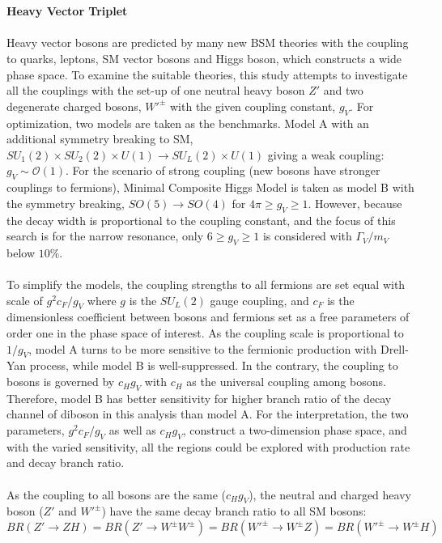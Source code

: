 \\
\\{\bf Heavy Vector Triplet}
\\
\\Heavy vector bosons are predicted by many new BSM theories with the coupling to quarks, leptons, SM vector bosons and Higgs boson, which constructs a wide phase space. To examine the suitable theories, this study attempts to investigate all the couplings with the set-up of one neutral heavy boson $Z'$ and two degenerate charged bosons, $W'^{\pm}$ with the given coupling constant, $g_{V}$. For optimization,  two models are taken as the benchmarks. Model A with an additional symmetry breaking to SM, $SU_{1}(2)\times SU_{2}(2) \times U(1) \rightarrow SU_{L}(2) \times U(1)$ giving a weak coupling: $g_{V} \sim \mathcal{O}(1)$. For the scenario of strong coupling (new bosons have stronger couplings to fermions), Minimal Composite Higgs Model is taken as model B with the symmetry breaking, $SO(5) \rightarrow SO(4)$ for $4\pi \geq g_{V} \geq 1$. However, because the decay width is proportional to the coupling constant, and the focus of this search is for the narrow resonance, only $6 \geq g_{V} \geq 1$ is considered with $\Gamma_{V}/m_{V}$ below $10\%$.
\\
\\To simplify the models, the coupling strengths to all fermions are set equal with scale of $g^2c_{F}/g_{V}$ where $g$ is the $SU_{L}(2)$ gauge coupling, and $c_{F}$ is the dimensionless coefficient between bosons and fermions set as a free parameters of order one in the phase space of interest. As the coupling scale is proportional to $1/g_{V}$, model A turns to be more sensitive to the fermionic production with Drell-Yan process, while model B is well-suppressed. In the contrary, the coupling to bosons is governed by $c_{H}g_{V}$ with $c_{H}$ as the universal coupling among bosons. Therefore, model B has better sensitivity for higher branch ratio of the decay channel of diboson in this analysis than model A. For the interpretation, the two parameters, $g^2c_{F}/g_{V}$ as well as $c_{H}g_{V}$, construct a two-dimension phase space, and with the varied sensitivity, all the regions could be explored with production rate and decay branch ratio. 
\\
\\As the coupling to all bosons are the same ($c_{H}g_{V}$), the neutral and charged heavy boson ($Z'$ and $W'^{\pm}$) have the same decay branch ratio to all SM bosons:
\begin{equation}
BR(Z'\rightarrow ZH) = BR(Z'\rightarrow W^\pm W^\pm) = BR(W'^\pm \rightarrow W^\pm Z) = BR(W'^\pm \rightarrow W^\pm H)
\end{equation}
